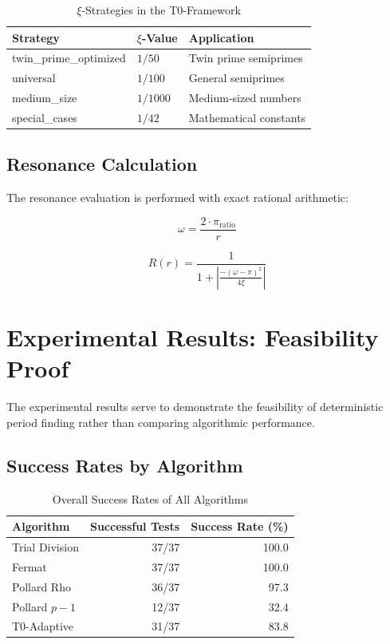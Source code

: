 	\begin{table}[H]
		\centering
		\caption{$\xi$-Strategies in the T0-Framework}
		\begin{tabular}{lll}
			\toprule
			\textbf{Strategy} & \textbf{$\xi$-Value} & \textbf{Application} \\
			\midrule
			twin\_prime\_optimized & $1/50$ & Twin prime semiprimes \\
			universal & $1/100$ & General semiprimes \\
			medium\_size & $1/1000$ & Medium-sized numbers \\
			special\_cases & $1/42$ & Mathematical constants \\
			\bottomrule
		\end{tabular}
		\label{tab:xi_strategies}
	\end{table}
	
	\subsection{Resonance Calculation}
	
	The resonance evaluation is performed with exact rational arithmetic:
	
	\begin{equation}
		\omega = \frac{2 \cdot \pi_{\text{ratio}}}{r}
	\end{equation}
	
	\begin{equation}
		R(r) = \frac{1}{1 + \left|\frac{-(\omega-\pi)^2}{4\xi}\right|}
	\end{equation}
	
	\section{Experimental Results: Feasibility Proof}
	
	The experimental results serve to demonstrate the feasibility of deterministic period finding rather than comparing algorithmic performance.
	
	\subsection{Success Rates by Algorithm}
	
	\begin{table}[H]
		\centering
		\caption{Overall Success Rates of All Algorithms}
		\begin{tabular}{lrr}
			\toprule
			\textbf{Algorithm} & \textbf{Successful Tests} & \textbf{Success Rate (\%)} \\
			\midrule
			Trial Division & 37/37 & 100.0 \\
			Fermat & 37/37 & 100.0 \\
			Pollard Rho & 36/37 & 97.3 \\
			Pollard $p-1$ & 12/37 & 32.4 \\
			T0-Adaptive & 31/37 & 83.8 \\
			\bottomrule
		\end{tabular}
		\label{tab:success_rates}
	\end{table}
	
